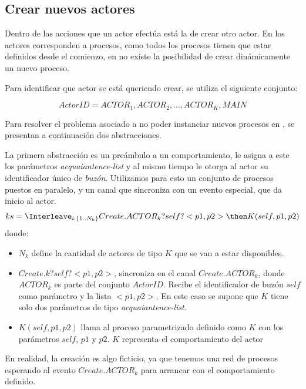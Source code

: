 \subsection{Crear nuevos actores}\label{modelo:crear}

Dentro de las acciones que un actor efectúa está la de crear otro actor. En \CSP los actores corresponden a procesos, como todos los procesos tienen que estar definidos desde el comienzo, en \CSP no existe la posibilidad de crear dinámicamente un nuevo proceso.

Para identificar que actor se está queriendo crear, se utiliza el siguiente conjunto: 

\begin{equation}\label{eq:actorid}
  ActorID = { ACTOR_1, ACTOR_2, \ldots, ACTOR_K, MAIN }
\end{equation}

Para resolver el problema asociado a no poder instanciar nuevos procesos en \CSP, se presentan a continuación dos abstracciones.

La primera abstracción es un preámbulo a un comportamiento, le asigna a este los parámetros \textit{acquaiantence-list} y al mismo tiempo le otorga al actor su identificador único de \textit{buzón}. Utilizamos para esto un conjunto de procesos puestos en paralelo, y un canal que sincroniza con un evento especial, que da inicio al actor.
\begin{equation}\label{eq:createactor}
ks = \Interleave_{i: \{1 .. N_k\}} Create.ACTOR_k?self?<p1, p2> \then K(self, p1, p2) 
\end{equation}
donde:
\begin{itemize}
 \item $N_k$ define la cantidad de actores de tipo $K$ que se van a estar disponibles.
 \item $Create.k?self?<p1, p2>$, sincroniza en el canal $Create.ACTOR_k$, donde $ACTOR_k$ es parte del conjunto $ActorID$. Recibe el identificador de buzón $self$ como parámetro y la lista $<p1, p2>$. En este caso se supone que $K$ tiene solo dos parámetros de tipo \textit{acquaiantence-list}. 
 \item $K(self, p1, p2)$ llama al proceso parametrizado definido como $K$ con los parámetros $self$, $p1$ y $p2$. $K$ representa el comportamiento del actor
\end{itemize}

En realidad, la creación es algo ficticio, ya que tenemos una red de procesos \CSP esperando al evento $Create.ACTOR_k$ para arrancar con el comportamiento definido. 

